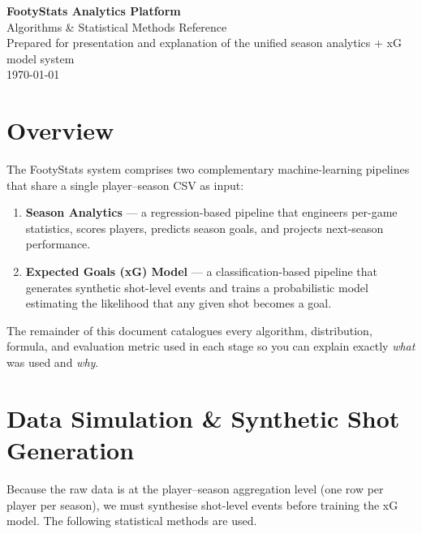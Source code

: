 \documentclass[11pt,a4paper]{article}
\begin{document}
\begin{center}
  {\LARGE\bfseries FootyStats Analytics Platform}\\[6pt]
  {\large Algorithms \& Statistical Methods Reference}\\[10pt]
  {\normalsize Prepared for presentation and explanation of the unified
   season analytics + xG model system}\\[4pt]
  {\small\today}
\end{center}

\vspace{1em}

\tableofcontents
\newpage

\section{Overview}

The FootyStats system comprises two complementary machine-learning pipelines
that share a single player--season CSV as input:

\begin{enumerate}
  \item \textbf{Season Analytics} --- a regression-based pipeline that
        engineers per-game statistics, scores players, predicts season goals,
        and projects next-season performance.
  \item \textbf{Expected Goals (xG) Model} --- a classification-based pipeline
        that generates synthetic shot-level events and trains a probabilistic
        model estimating the likelihood that any given shot becomes a goal.
\end{enumerate}

The remainder of this document catalogues every algorithm, distribution,
formula, and evaluation metric used in each stage so you can explain exactly
\emph{what} was used and \emph{why}.


\section{Data Simulation \& Synthetic Shot Generation}

Because the raw data is at the player--season aggregation level (one row per
player per season), we must synthesise shot-level events before training the
xG model.  The following statistical methods are used.
\end{document}
